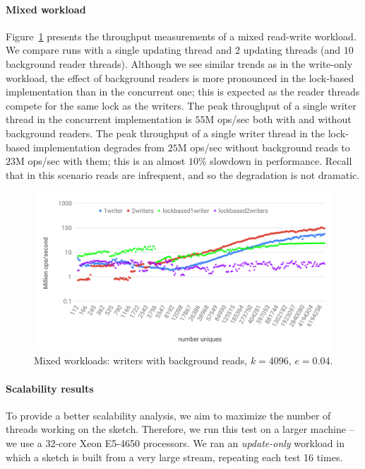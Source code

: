 \paragraph{Mixed workload}
Figure~\ref{fig:mixed-throughput} presents the throughput measurements
of a mixed read-write workload. We compare runs with a single updating thread and $2$
updating threads (and $10$ background reader threads).
Although we see similar trends as in the write-only workload, the effect of
background readers is more pronounced in the lock-based implementation than in the concurrent one;
this is expected as the reader threads compete for the same lock as the writers.
The peak throughput of a single writer thread in the concurrent implementation is $55$M ops/sec both with and
without background readers. The peak throughput of a single writer thread in the lock-based
implementation degrades from $25$M ops/sec without background reads to $23$M ops/sec with them; this is an almost $10$\% slowdown in performance.
Recall that in this scenario reads are infrequent, and so the degradation is not dramatic.

\begin{figure}[tb]
\setlength{\abovecaptionskip}{0pt}
\setlength{\belowcaptionskip}{0pt}
\setlength\textfloatsep{0pt}
	\centering
	\includegraphics[width=\columnwidth]{images/theta-mixed.pdf}
	\caption{{Mixed workloads: writers with background reads, $k = 4096$, $e=0.04$.}}
	\label{fig:mixed-throughput}
\end{figure}


\paragraph{Scalability results}
To provide a better scalability analysis, we aim to maximize the number of threads working on the
sketch. Therefore, we run this test on a larger machine -- we use a 32-core Xeon E5-4650 processors.
We ran an \emph{update-only} workload in which a sketch is built from a very large stream, repeating
each test 16 times.

